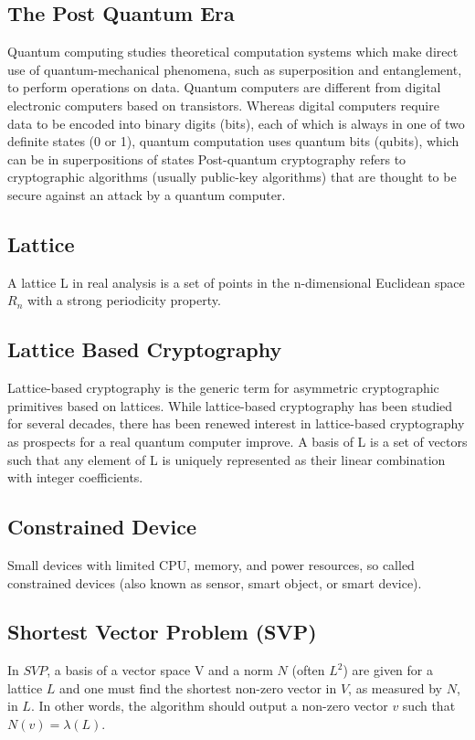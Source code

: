 \documentclass[conference]{IEEEtran}
\begin{document}
\subsection{The Post Quantum Era}
Quantum computing studies theoretical computation systems which make direct use of quantum-mechanical phenomena, such as superposition and entanglement, to perform operations on data. Quantum computers are different from digital electronic computers based on transistors. Whereas digital computers require data to be encoded into binary digits (bits), each of which is always in one of two definite states (0 or 1), quantum computation uses quantum bits (qubits), which can be in superpositions of states
Post-quantum cryptography refers to cryptographic algorithms (usually public-key algorithms) that are thought to be secure against an attack by a quantum computer. 
\subsection{Lattice}
A lattice L in real analysis is a set of points in the n-dimensional Euclidean space $R_n$ with a strong periodicity property.
\subsection{Lattice Based Cryptography}
Lattice-based cryptography is the generic term for asymmetric cryptographic primitives based on lattices. While lattice-based cryptography has been studied for several decades, there has been renewed interest in lattice-based cryptography as prospects for a real quantum computer improve. A basis of L is a set of vectors such that any element of L is uniquely represented as their linear combination with integer coefficients.
\subsection{Constrained Device}
Small devices with limited CPU, memory, and power resources, so called constrained devices (also known as sensor, smart object, or smart device).
\subsection{Shortest Vector Problem (SVP)}
In $SVP$, a basis of a vector space V and a norm $N$ (often $L^2$) are given for a lattice $L$ and one must find the shortest non-zero vector in $V$, as measured by $N$, in $L$. In other words, the algorithm should output a non-zero vector $v$ such that $N(v)=\lambda(L)$.
\end{document}
